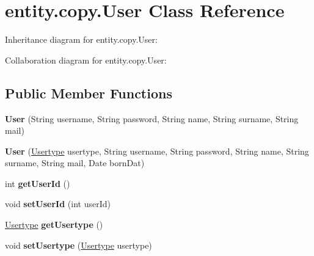 \hypertarget{classentity_1_1copy_1_1_user}{}\section{entity.\+copy.\+User Class Reference}
\label{classentity_1_1copy_1_1_user}


Inheritance diagram for entity.\+copy.\+User\+:


Collaboration diagram for entity.\+copy.\+User\+:
\subsection*{Public Member Functions}
\begin{DoxyCompactItemize}
\item 
\mbox{\label{classentity_1_1copy_1_1_user_a3d1d599f49b62f3787f76ecc14bd4b26}} 
{\bfseries User} (String username, String password, String name, String surname, String mail)
\item 
\mbox{\label{classentity_1_1copy_1_1_user_af3fafb386b26e122c8c04668e92e2139}} 
{\bfseries User} (\mbox{\hyperlink{classentity_1_1copy_1_1_usertype}{Usertype}} usertype, String username, String password, String name, String surname, String mail, Date born\+Dat)
\item 
\mbox{\label{classentity_1_1copy_1_1_user_a51bb3fd5a6d840d1404eeeba737e9ed5}} 
int {\bfseries get\+User\+Id} ()
\item 
\mbox{\label{classentity_1_1copy_1_1_user_a659716ed68a5f63bb25bae1d844873a7}} 
void {\bfseries set\+User\+Id} (int user\+Id)
\item 
\mbox{\label{classentity_1_1copy_1_1_user_a4a466b5a05d942d54f6cab56f08f3eeb}} 
\mbox{\hyperlink{classentity_1_1copy_1_1_usertype}{Usertype}} {\bfseries get\+Usertype} ()
\item 
\mbox{\label{classentity_1_1copy_1_1_user_a773cc7f0f234cbd6e46b730a6fe5a33c}} 
void {\bfseries set\+Usertype} (\mbox{\hyperlink{classentity_1_1copy_1_1_usertype}{Usertype}} usertype)
\item 

\end{DoxyCompactItemize}
